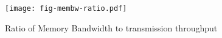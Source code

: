 \begin{figure}[t]
\texttt{[image: fig-membw-ratio.pdf]}
\caption{Ratio of Memory Bandwidth to transmission throughput}
\label{fig:membw-ratio}
\end{figure}

